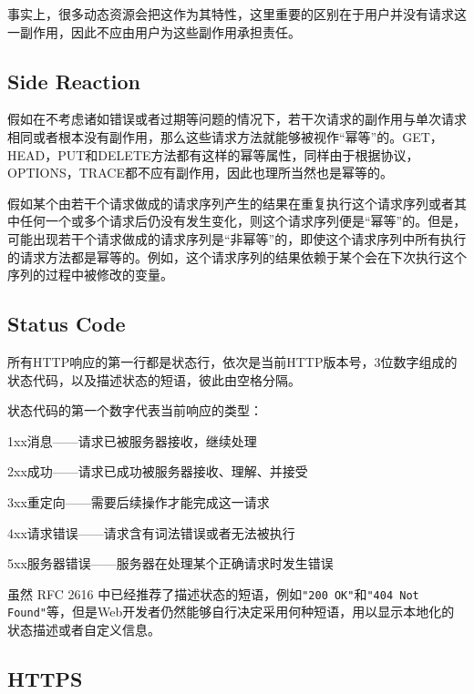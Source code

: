 事实上，很多动态资源会把这作为其特性，这里重要的区别在于用户并没有请求这一副作用，因此不应由用户为这些副作用承担责任。




\subsection{Side Reaction}


假如在不考虑诸如错误或者过期等问题的情况下，若干次请求的副作用与单次请求相同或者根本没有副作用，那么这些请求方法就能够被视作“幂等”的。GET，HEAD，PUT和DELETE方法都有这样的幂等属性，同样由于根据协议，OPTIONS，TRACE都不应有副作用，因此也理所当然也是幂等的。

假如某个由若干个请求做成的请求序列产生的结果在重复执行这个请求序列或者其中任何一个或多个请求后仍没有发生变化，则这个请求序列便是“幂等”的。但是，可能出现若干个请求做成的请求序列是“非幂等”的，即使这个请求序列中所有执行的请求方法都是幂等的。例如，这个请求序列的结果依赖于某个会在下次执行这个序列的过程中被修改的变量。


\subsection{Status Code}


所有HTTP响应的第一行都是状态行，依次是当前HTTP版本号，3位数字组成的状态代码，以及描述状态的短语，彼此由空格分隔。

状态代码的第一个数字代表当前响应的类型：

\begin{compactitem}
\item 1xx消息——请求已被服务器接收，继续处理
\item 2xx成功——请求已成功被服务器接收、理解、并接受
\item 3xx重定向——需要后续操作才能完成这一请求
\item 4xx请求错误——请求含有词法错误或者无法被执行
\item 5xx服务器错误——服务器在处理某个正确请求时发生错误
\end{compactitem}

虽然 RFC 2616 中已经推荐了描述状态的短语，例如\texttt{"200 OK"}和\texttt{"404 Not Found"}等，但是Web开发者仍然能够自行决定采用何种短语，用以显示本地化的状态描述或者自定义信息。






\subsection{HTTPS}

